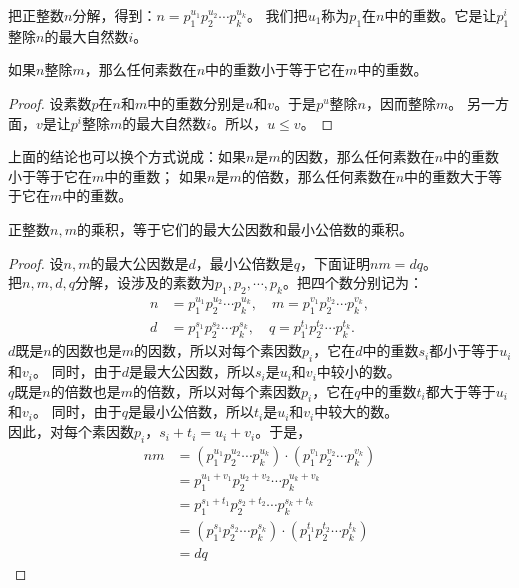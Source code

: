 \documentclass[12pt,UTF8]{ctexbook}
\begin{document}
把正整数$n$分解，得到：$n = p_1^{u_1} p_2^{u_2} \cdots p_k^{u_k}$。
我们把$u_1$称为$p_1$在$n$中的重数。它是让$p_1^i$整除$n$的最大自然数$i$。
\begin{tm}\label{tm:1-1-10}
    如果$n$整除$m$，那么任何素数在$n$中的重数小于等于它在$m$中的重数。
\end{tm}
\begin{proof}
    设素数$p$在$n$和$m$中的重数分别是$u$和$v$。于是$p^u$整除$n$，因而整除$m$。
    另一方面，$v$是让$p^i$整除$m$的最大自然数$i$。所以，$u \leqslant v$。
\end{proof}

上面的结论也可以换个方式说成：如果$n$是$m$的因数，那么任何素数在$n$中的重数小于等于它在$m$中的重数；
如果$n$是$m$的倍数，那么任何素数在$n$中的重数大于等于它在$m$中的重数。

\begin{tm}\label{tm:1-1-20}
    正整数$n,m$的乘积，等于它们的最大公因数和最小公倍数的乘积。
\end{tm}
\begin{proof}
    设$n,m$的最大公因数是$d$，最小公倍数是$q$，下面证明$nm = dq$。\\
    把$n,m,d,q$分解，设涉及的素数为$p_1, p_2, \cdots , p_k$。把四个数分别记为：
    \begin{align*}
        n &= p_1^{u_1}p_2^{u_2}\cdots p_k^{u_k}, \quad m = p_1^{v_1}p_2^{v_2}\cdots p_k^{v_k},  \\
        d &= p_1^{s_1}p_2^{s_2}\cdots p_k^{s_k}, \quad q = p_1^{t_1}p_2^{t_2}\cdots p_k^{t_k}.  
    \end{align*}
    $d$既是$n$的因数也是$m$的因数，所以对每个素因数$p_i$，它在$d$中的重数$s_i$都小于等于$u_i$和$v_i$。
    同时，由于$d$是最大公因数，所以$s_i$是$u_i$和$v_i$中较小的数。\\
    $q$既是$n$的倍数也是$m$的倍数，所以对每个素因数$p_i$，它在$q$中的重数$t_i$都大于等于$u_i$和$v_i$。
    同时，由于$q$是最小公倍数，所以$t_i$是$u_i$和$v_i$中较大的数。\\
    因此，对每个素因数$p_i$，$s_i + t_i = u_i + v_i$。于是，
    \begin{align*}
        nm &= \left(p_1^{u_1}p_2^{u_2}\cdots p_k^{u_k}\right) \cdot \left(p_1^{v_1}p_2^{v_2}\cdots p_k^{v_k}\right)  \\
        &= p_1^{u_1 + v_1}p_2^{u_2 + v_2}\cdots p_k^{u_k + v_k}  \\
        &= p_1^{s_1 + t_1}p_2^{s_2 + t_2}\cdots p_k^{s_k + t_k}  \\
        &= \left(p_1^{s_1}p_2^{s_2}\cdots p_k^{s_k}\right) \cdot \left(p_1^{t_1}p_2^{t_2}\cdots p_k^{t_k}\right)  \\
        &= dq 
    \end{align*}    

\end{proof}
\end{document}
